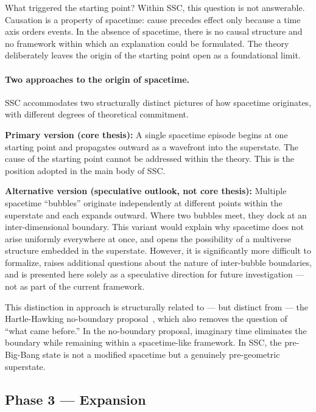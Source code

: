 \documentclass[12pt,a4paper]{article}
\begin{document}
What triggered the starting point?  Within SSC, this question is not
answerable.  Causation is a property of spacetime: cause precedes
effect only because a time axis orders events.  In the absence of
spacetime, there is no causal structure and no framework within which
an explanation could be formulated.  The theory deliberately leaves the
origin of the starting point open as a foundational limit.

\paragraph{Two approaches to the origin of spacetime.}

SSC accommodates two structurally distinct pictures of how spacetime
originates, with different degrees of theoretical commitment.

\textbf{Primary version (core thesis):}  A single spacetime episode
begins at one starting point and propagates outward as a wavefront into
the superstate.  The cause of the starting point cannot be addressed
within the theory.  This is the position adopted in the main body of
SSC.

\textbf{Alternative version (speculative outlook, not core thesis):}
Multiple spacetime ``bubbles'' originate independently at different
points within the superstate and each expands outward.  Where two
bubbles meet, they dock at an inter-dimensional boundary.  This variant
would explain why spacetime does not arise uniformly everywhere at once,
and opens the possibility of a multiverse structure embedded in the
superstate.  However, it is significantly more difficult to formalize,
raises additional questions about the nature of inter-bubble boundaries,
and is presented here solely as a speculative direction for future
investigation — not as part of the current framework.

This distinction in approach is structurally related to — but distinct
from — the Hartle-Hawking no-boundary proposal~\citep{hartle1983},
which also removes the question of ``what came before.''  In the
no-boundary proposal, imaginary time eliminates the boundary while
remaining within a spacetime-like framework.  In SSC, the pre-Big-Bang
state is not a modified spacetime but a genuinely pre-geometric
superstate.

\subsection*{Phase 3 — Expansion}
\end{document}

